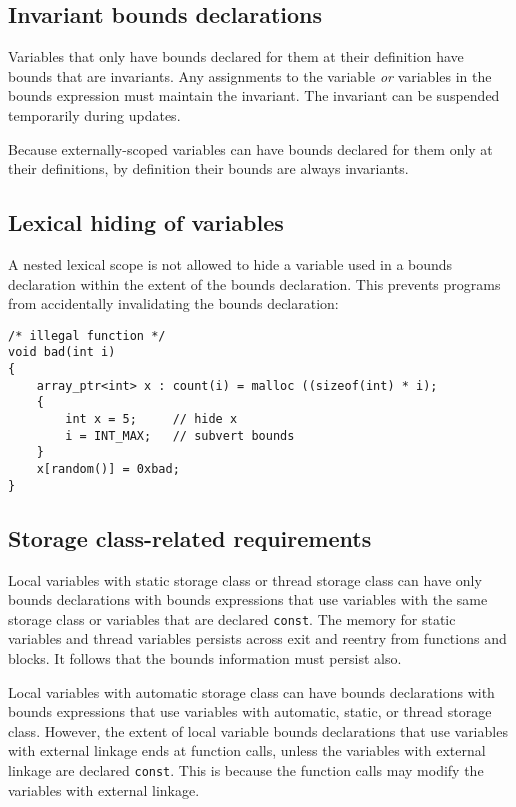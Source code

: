 \subsection{Invariant bounds declarations}

Variables that only have bounds declared for them at their definition
have bounds that are invariants. Any assignments to the variable
\emph{or} variables in the bounds expression must maintain the
invariant. The invariant can be suspended temporarily during updates.

Because externally-scoped \arrayptr variables can have bounds declared
for them only at their definitions, by definition their bounds are
always invariants.

\subsection{Lexical hiding of variables}

A nested lexical scope is not allowed to hide a variable used in a
bounds declaration within the extent of the bounds declaration. This
prevents programs from accidentally invalidating the bounds declaration:

\begin{verbatim}
/* illegal function */
void bad(int i) 
{
    array_ptr<int> x : count(i) = malloc ((sizeof(int) * i);
    {
        int x = 5;     // hide x
        i = INT_MAX;   // subvert bounds
    }
    x[random()] = 0xbad;
}
\end{verbatim}

\subsection{Storage class-related requirements}

Local variables with static storage class or thread storage class can
have only bounds declarations with bounds expressions that use variables
with the same storage class or variables that are declared
\texttt{const}. The memory for static variables and thread variables
persists across exit and reentry from functions and blocks. It follows
that the bounds information must persist also.

Local variables with automatic storage class can have bounds
declarations with bounds expressions that use variables with automatic,
static, or thread storage class. However, the extent of local variable
bounds declarations that use variables with external linkage ends at
function calls, unless the variables with external linkage are declared
\texttt{const}. This is because the function calls may modify the
variables with external linkage.

